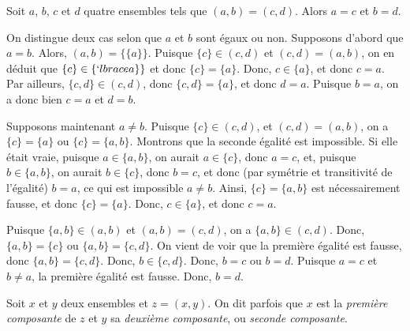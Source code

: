 \blank[medium]

\noindent{} Soit $a$, $b$, $c$ et $d$ quatre ensembles tels que $(a,b) = (c,d)$.
    Alors $a = c$ et $b = d$.

\blank[medium]

\noindent{} On distingue deux cas selon que $a$ et $b$ sont égaux ou non. 
    Supposons d'abord que $a=b$. Alors, $(a,b) = \lbrace \lbrace a \rbrace \rbrace$. 
    Puisque $\lbrace c \rbrace \in (c,d)$ et $(c,d) = (a,b)$, on en déduit que $\lbrace c \rbrace \in \lbrace `lbrace a \rbrace \rbrace$ et donc $\lbrace c \rbrace = \lbrace a \rbrace$.
    Donc, $c \in \lbrace a \rbrace$, et donc $c = a$.
    Par ailleurs, $\lbrace c, d \rbrace \in (c,d)$, donc $\lbrace c, d \rbrace = \lbrace a \rbrace$, et donc $d = a$.
    Puisque $b = a$, on a donc bien $c = a$ et $d = b$.
    
    Supposons maintenant $a \neq b$.
    Puisque $\lbrace c \rbrace \in (c,d)$, et $(c,d) = (a,b)$, on a $\lbrace c \rbrace = \lbrace a \rbrace$ ou $\lbrace c \rbrace = \lbrace a, b \rbrace$.
    Montrons que la seconde égalité est impossible. 
    Si elle était vraie, puisque $a \in \lbrace a, b \rbrace$, on aurait $a \in \lbrace c \rbrace$, donc $a = c$, et, puisque $b \in \lbrace a,b \rbrace$, on aurait $b \in \lbrace c \rbrace$, donc $b = c$, et donc (par symétrie et transitivité de l'égalité) $b = a$, ce qui est impossible $a \neq b$.
    Ainsi, $\lbrace c \rbrace = \lbrace a, b \rbrace$ est nécessairement fausse, et donc $\lbrace c \rbrace = \lbrace a \rbrace$. 
    Donc, $c \in \lbrace a \rbrace$, et donc $c = a$. 
    
    Puisque $\lbrace a,b \rbrace \in (a,b)$ et $(a,b)=(c,d)$, on a $\lbrace a,b \rbrace \in (c,d)$.
    Donc, $\lbrace a,b \rbrace = \lbrace c \rbrace$ ou $\lbrace a,b \rbrace = \lbrace c, d \rbrace$.
    On vient de voir que la première égalité est fausse, donc $\lbrace a,b \rbrace = \lbrace c, d \rbrace$.
    Donc, $b \in \lbrace c, d \rbrace$. 
    Donc, $b = c$ ou $b = d$. 
    Puisque $a = c$ et $b \neq a$, la première égalité est fausse. 
    Donc, $b = d$. 

   \done 

\blank[medium]

Soit $x$ et $y$ deux ensembles et $z = (x,y)$. 
On dit parfois que $x$ est la \emph{première composante} de $z$ et $y$ sa \emph{deuxième composante}, ou \emph{seconde composante}.

\stopsubsection

\startsubsection[title=Produit Cartésien]

